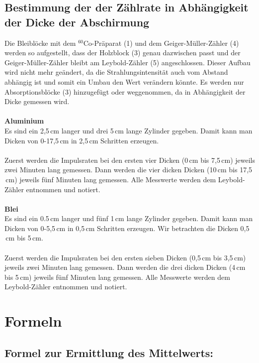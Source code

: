 \documentclass[fontsize=12pt]{scrartcl}
\begin{document}
\subsection{Bestimmung der der Zählrate in Abhängigkeit der Dicke der Abschirmung}
Die Bleiblöcke mit dem $^{60}$Co-Präparat (1) und dem Geiger-Müller-Zähler (4) werden so aufgestellt, dass der Holzblock (3) genau dazwischen passt 
und der Geiger-Müller-Zähler bleibt am Leybold-Zähler (5) angeschlossen. Dieser Aufbau wird nicht mehr geändert, da die Strahlungsintensität auch vom 
Abstand abhängig ist und somit ein Umbau den Wert verändern könnte. Es werden nur Absorptionsblöcke (3) hinzugefügt oder weggenommen, da in 
Abhängigkeit der Dicke gemessen wird.\\
~\\
\textbf{Aluminium}\\
Es sind ein 2,5$\,\text{cm}$ langer und drei 5$\,\text{cm}$ lange Zylinder gegeben. Damit kann man Dicken von 0-17,5$\,\text{cm}$ in 2,5$\,\text{cm}$ 
Schritten erzeugen.\\
~\\
Zuerst werden die Impulsraten bei den ersten vier Dicken (0$\,\text{cm}$ bis 7,5$\,\text{cm}$) jeweils zwei Minuten lang gemessen. Dann werden die vier 
dicken Dicken (10$\,\text{cm}$ bis 17,5$\,\text{cm}$) jeweils fünf Minuten lang gemessen. Alle Messwerte werden dem Leybold-Zähler entnommen und 
notiert.\\
~\\
\textbf{Blei}\\
Es sind ein 0.5$\,\text{cm}$ langer und fünf 1$\,\text{cm}$ lange Zylinder gegeben. Damit kann man Dicken von 0-5,5$\,\text{cm}$ in 0,5$\,\text{cm}$ 
Schritten erzeugen. Wir betrachten die Dicken 0,5$\,\text{cm}$ bis 5$\,\text{cm}$.\\
~\\
Zuerst werden die Impulsraten bei den ersten sieben Dicken (0,5$\,\text{cm}$ bis 3,5$\,\text{cm}$) jeweils zwei Minuten lang gemessen. Dann werden die 
drei dicken Dicken (4$\,\text{cm}$ bis 5$\,\text{cm}$) jeweils fünf Minuten lang gemessen. Alle Messwerte werden dem Leybold-Zähler entnommen und 
notiert.
\newpage
\section{ Formeln}

\subsection{Formel zur Ermittlung des Mittelwerts:}
\end{document}
